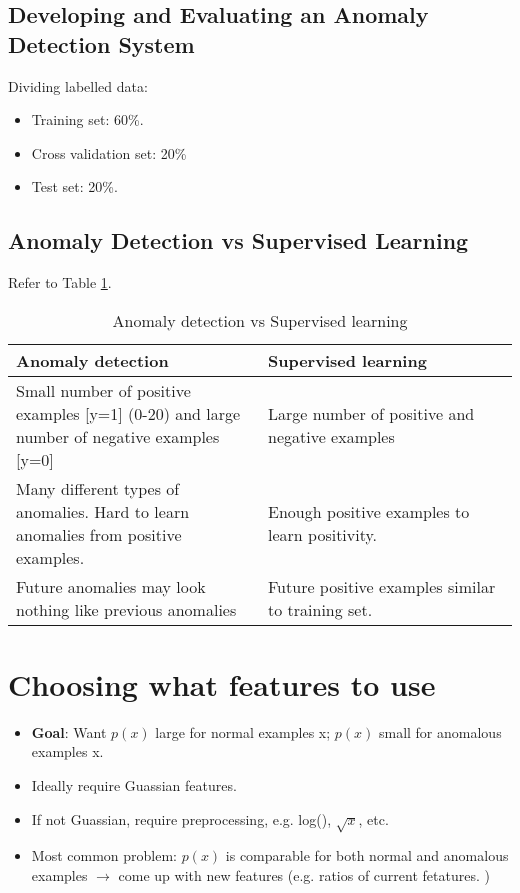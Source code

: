     \subsection{Developing and Evaluating an Anomaly Detection System}
        Dividing labelled data:
        \begin{itemize}
            \item Training set: 60\%.
            \item Cross validation set: 20\%
            \item Test set: 20\%.
        \end{itemize}
    
    \subsection{Anomaly Detection vs Supervised Learning}
    Refer to Table \ref{tab:anomaly_detection_vs_supervised_learning}. 

    \begin{table}[htpb]
            \centering
            \begin{tabular}{|p{0.5\linewidth}|p{0.5\linewidth}|}
                \hline
                Anomaly detection & Supervised learning \\
                \hline
                Small number of positive examples [y=1] (0-20) and large number of negative examples [y=0] & Large number of positive and negative examples \\
                \hline 
                Many different types of anomalies. Hard to learn anomalies from positive examples.  & Enough positive examples to learn positivity. \\
                \hline 
                Future anomalies may look nothing like previous anomalies & Future positive examples similar to training set.\\
                \hline
            \end{tabular}
            \caption{Anomaly detection vs Supervised learning}
            \label{tab:anomaly_detection_vs_supervised_learning}
        \end{table}
    
    \section{Choosing what features to use}
        \begin{itemize}
            \item \textbf{Goal}: Want $p(x)$ large for normal examples x; $p(x)$ small for anomalous examples x. 
            \item Ideally require Guassian features. 
            \item If not Guassian, require preprocessing, e.g. log(), $\sqrt{x}$, etc. 
            \item Most common problem: $p(x)$ is comparable for both normal and anomalous examples $\rightarrow$ come up with new features (e.g. ratios of current fetatures. )
        \end{itemize}
            
